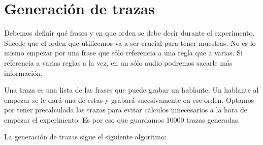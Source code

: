 \documentclass[11pt,a4paper,twoside]{tesis}
\begin{document}
\section{Generación de trazas}



Debemos definir qué frases y en que orden se debe decir durante el experimento. Sucede que el orden que utilicemos va a ser crucial para tener muestras. No es lo mismo empezar por una frase que sólo referencia a una regla que a varias. Si referencia a varias reglas a la vez, en un sólo audio podremos sacarle más información.

Una traza es una lista de las frases que puede grabar un hablante. Un hablante al empezar se le dará una de estas y grabará sucesivamente en ese orden. Optamos por tener precalculada las trazas para evitar cálculos innecesarios a la hora de empezar el experimento. Es por eso que guardamos 10000 trazas generadas. 

La generación de trazas sigue el siguiente algoritmo:
\end{document}

